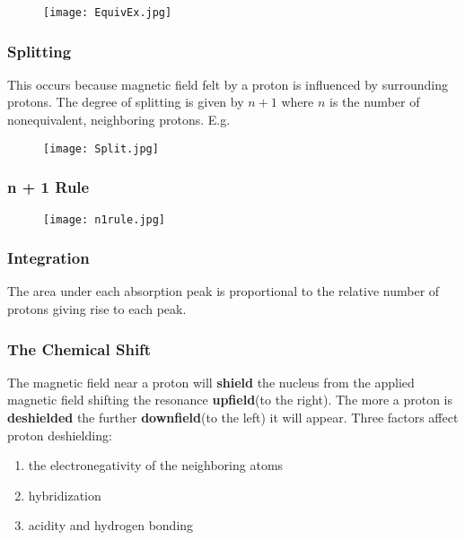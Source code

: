 \documentclass[../OChemReview.tex]{subfiles}
\begin{document}
	\begin{figure}[h]
		\centering
		\texttt{[image: EquivEx.jpg]}
	\end{figure} 
	
	\subsubsection{Splitting}
	
	This occurs because magnetic field felt by a proton is influenced by surrounding protons. The degree of splitting is given by $ n + 1 $ where $ n $ is the number of nonequivalent, neighboring protons. E.g.
	
	\begin{figure}[h]
		\centering
		\texttt{[image: Split.jpg]}
	\end{figure}
	
	\subsubsection{n + 1 Rule}
	
	\begin{figure}[h]
		\centering
		\texttt{[image: n1rule.jpg]}
	\end{figure}
		
	\subsubsection{Integration}
	
	The area under each absorption peak is proportional to the relative number of protons giving rise to each peak.
	
	\subsubsection{The Chemical Shift}
	
	The magnetic field near a proton will \textbf{shield} the nucleus from the applied magnetic field shifting the resonance \textbf{upfield}(to the right). The more a proton is \textbf{deshielded} the further \textbf{downfield}(to the left) it will appear. Three factors affect proton deshielding:
	\begin{enumerate}
		\item the electronegativity of the neighboring atoms
		\item hybridization
		\item acidity and hydrogen bonding
	\end{enumerate}
	
\end{document}
